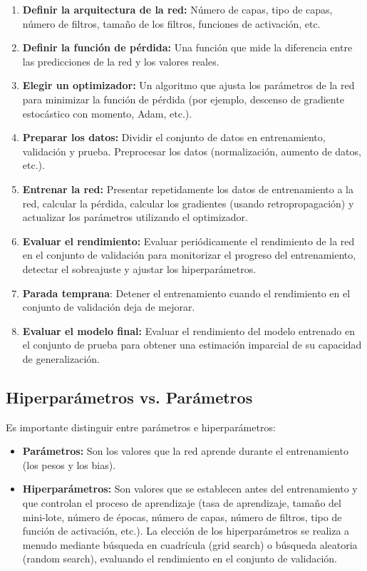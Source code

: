 \documentclass{article}
\begin{document}
\begin{enumerate}
    \item \textbf{Definir la arquitectura de la red:} Número de capas, tipo de capas, número de filtros, tamaño de los filtros, funciones de activación, etc.
    \item \textbf{Definir la función de pérdida:}  Una función que mide la diferencia entre las predicciones de la red y los valores reales.
    \item \textbf{Elegir un optimizador:} Un algoritmo que ajusta los parámetros de la red para minimizar la función de pérdida (por ejemplo, descenso de gradiente estocástico con momento, Adam, etc.).
    \item \textbf{Preparar los datos:} Dividir el conjunto de datos en entrenamiento, validación y prueba. Preprocesar los datos (normalización, aumento de datos, etc.).
    \item \textbf{Entrenar la red:} Presentar repetidamente los datos de entrenamiento a la red, calcular la pérdida, calcular los gradientes (usando retropropagación) y actualizar los parámetros utilizando el optimizador.
    \item \textbf{Evaluar el rendimiento:}  Evaluar periódicamente el rendimiento de la red en el conjunto de validación para monitorizar el progreso del entrenamiento, detectar el sobreajuste y ajustar los hiperparámetros.
     \item \textbf{Parada temprana}: Detener el entrenamiento cuando el rendimiento en el conjunto de validación deja de mejorar.
    \item \textbf{Evaluar el modelo final:} Evaluar el rendimiento del modelo entrenado en el conjunto de prueba para obtener una estimación imparcial de su capacidad de generalización.
\end{enumerate}

\subsection{Hiperparámetros vs. Parámetros}

Es importante distinguir entre parámetros e hiperparámetros:

\begin{itemize}
    \item \textbf{Parámetros:}  Son los valores que la red aprende durante el entrenamiento (los pesos y los bias).
    \item \textbf{Hiperparámetros:}  Son valores que se establecen antes del entrenamiento y que controlan el proceso de aprendizaje (tasa de aprendizaje, tamaño del mini-lote, número de épocas, número de capas, número de filtros, tipo de función de activación, etc.).  La elección de los hiperparámetros se realiza a menudo mediante búsqueda en cuadrícula (grid search) o búsqueda aleatoria (random search), evaluando el rendimiento en el conjunto de validación.
\end{itemize}
\end{document}
